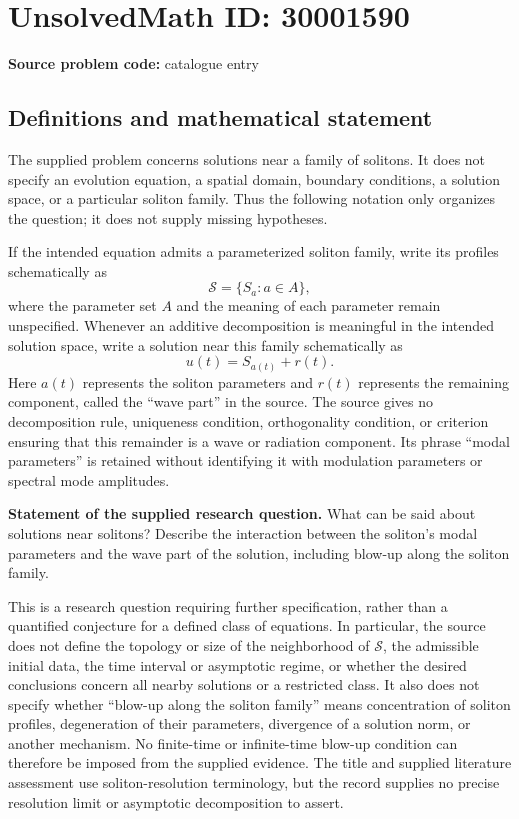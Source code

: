 \documentclass[11pt]{article}
\begin{document}
\section*{UnsolvedMath ID: 30001590}
\textbf{Source problem code:} catalogue entry
\subsection{Definitions and mathematical statement}
The supplied problem concerns solutions near a family of solitons. It does not specify an evolution equation, a spatial domain, boundary conditions, a solution space, or a particular soliton family. Thus the following notation only organizes the question; it does not supply missing hypotheses.

If the intended equation admits a parameterized soliton family, write its profiles schematically as
\[
\mathcal S=\{S_a:a\in A\},
\]
where the parameter set \(A\) and the meaning of each parameter remain unspecified. Whenever an additive decomposition is meaningful in the intended solution space, write a solution near this family schematically as
\[
u(t)=S_{a(t)}+r(t).
\]
Here \(a(t)\) represents the soliton parameters and \(r(t)\) represents the remaining component, called the ``wave part'' in the source. The source gives no decomposition rule, uniqueness condition, orthogonality condition, or criterion ensuring that this remainder is a wave or radiation component. Its phrase ``modal parameters'' is retained without identifying it with modulation parameters or spectral mode amplitudes.

\textbf{Statement of the supplied research question.} What can be said about solutions near solitons? Describe the interaction between the soliton's modal parameters and the wave part of the solution, including blow-up along the soliton family.

This is a research question requiring further specification, rather than a quantified conjecture for a defined class of equations. In particular, the source does not define the topology or size of the neighborhood of \(\mathcal S\), the admissible initial data, the time interval or asymptotic regime, or whether the desired conclusions concern all nearby solutions or a restricted class. It also does not specify whether ``blow-up along the soliton family'' means concentration of soliton profiles, degeneration of their parameters, divergence of a solution norm, or another mechanism. No finite-time or infinite-time blow-up condition can therefore be imposed from the supplied evidence. The title and supplied literature assessment use soliton-resolution terminology, but the record supplies no precise resolution limit or asymptotic decomposition to assert.
\end{document}
